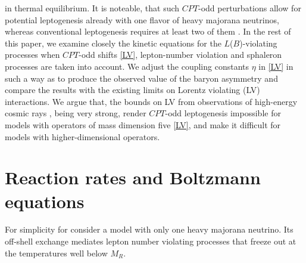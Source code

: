 \documentclass[12pt]{revtex4}
\begin{document}
	in thermal equilibrium.
	It is noteable, that such $CPT$-odd perturbations allow for potential leptogenesis already
	with one flavor of heavy majorana neutrinos, whereas conventional leptogenesis requires
	at least two of them \cite{Fukugita:1986hr}.
	In the rest of this paper, we examine closely the kinetic equations for the 
    $L$($B$)-violating processes when $CPT$-odd shifts \eqref{LV}, lepton-number violation and 
    sphaleron processes are taken into account. 
	We adjust the coupling constants $ \eta $ in \eqref{LV} in such a way as to produce 
	the observed value of the baryon asymmetry and compare the results with the existing
	limits on Lorentz violating (LV) interactions. 
	We argue that, the bounds on LV from observations of high-energy cosmic rays
\cite{Gagnon:2004xh}, 
	being very strong, render $CPT$-odd leptogenesis impossible for models with operators of 
	mass dimension five \eqref{LV}, and make it difficult for models with higher-dimensional operators.
	

%
%
\section{Reaction rates and Boltzmann equations}
\label{rates}

	For simplicity for  consider a model with only one heavy 
majorana neutrino. Its off-shell exchange mediates lepton number violating processes that 
	freeze out at the temperatures well below $ M_R $.
\end{document}
